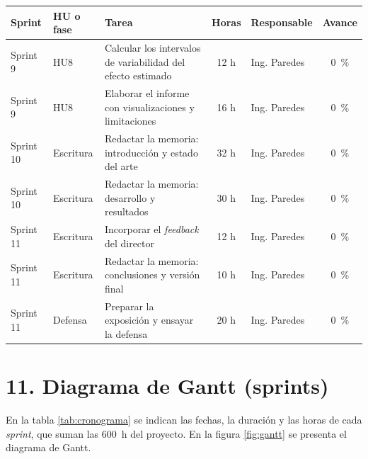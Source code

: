 \documentclass[
11pt, %
codirector, %
]{charter}
\begin{document}
\begin{table}[htpb]
\centering
\begin{tabularx}{\linewidth}{@{}|p{1.55cm}|p{2.62cm}|>{\raggedright\arraybackslash}X|c|l|c|@{}}
\hline
\rowcolor[HTML]{C0C0C0}
Sprint & HU o fase & Tarea & Horas & Responsable & Avance \\ \hline
Sprint 9 & HU8 & Calcular los intervalos de variabilidad del efecto estimado & 12 h & Ing. Paredes & 0~\% \\ \hline
Sprint 9 & HU8 & Elaborar el informe con visualizaciones y limitaciones & 16 h & Ing. Paredes & 0~\% \\ \hline
Sprint 10 & Escritura & Redactar la memoria: introducción y estado del arte & 32 h & Ing. Paredes & 0~\% \\ \hline
Sprint 10 & Escritura & Redactar la memoria: desarrollo y resultados & 30 h & Ing. Paredes & 0~\% \\ \hline
Sprint 11 & Escritura & Incorporar el \textit{feedback} del director & 12 h & Ing. Paredes & 0~\% \\ \hline
Sprint 11 & Escritura & Redactar la memoria: conclusiones y versión final & 10 h & Ing. Paredes & 0~\% \\ \hline
Sprint 11 & Defensa & Preparar la exposición y ensayar la defensa & 20 h & Ing. Paredes & 0~\% \\ \hline
\end{tabularx}
\end{table}


\section{11. Diagrama de Gantt (sprints)}
\label{sec:gantt}

En la tabla \ref{tab:cronograma} se indican las fechas, la duración y las horas de cada \textit{sprint}, que suman las 600~h del proyecto. En la figura \ref{fig:gantt} se presenta el diagrama de Gantt.
\end{document}
